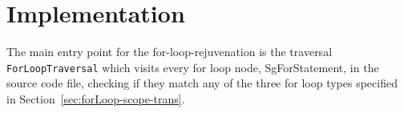 \documentclass[bsc,frontabs,singlespacing,twoside,parskip,deptreport]{infthesis}
\begin{document}

    

\section{Implementation}

The main entry point for the for-loop-rejuvenation is the traversal \texttt{ForLoopTraversal} which visits every for loop node, SgForStatement, in the source code file, checking if they match any of the three for loop types specified in Section~\ref{sec:forLoop-scope-trans}.
\end{document}
